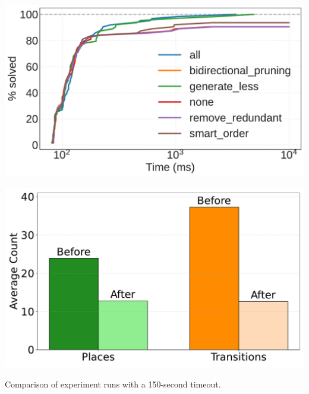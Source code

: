 \begin{center}
		\begin{minipage}[t]{0.48\textwidth}
		\centering
		\includegraphics[width=\linewidth]{plots/timeout_10000_cumulative_solved_log.pdf}
		\label{fig:timeout_cumulative_solved_log}
	\end{minipage}\hfill
	\begin{minipage}[t]{0.48\textwidth}
		\centering
		\includegraphics[width=\linewidth]{figures/petri_size_reduction_plot.pdf}
		\label{fig:petri_size_reduction}
	\end{minipage}
\end{center}







\begin{table}[H]
	\centering
	
	\caption{Comparison of experiment runs with a 150-second timeout.}
	\label{tab:semilinear-size-reduction}
\end{table}


